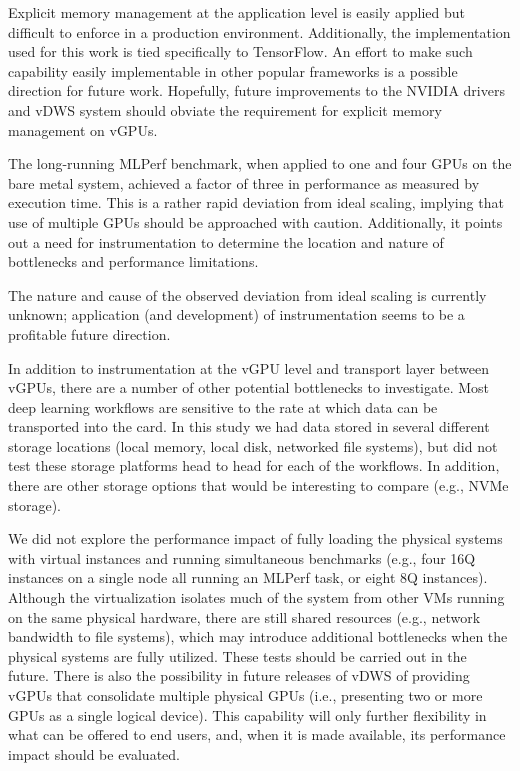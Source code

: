 \documentclass[acmtog, authorversion]{acmart}
\begin{document}
Explicit memory management at the application level is easily applied but difficult to enforce in a production environment. Additionally, the implementation used for this work is tied specifically to TensorFlow. An effort to make such capability easily implementable in other popular frameworks is a possible direction for future work. Hopefully, future improvements to the NVIDIA drivers and vDWS system should obviate the requirement for explicit memory management on vGPUs.

The long-running MLPerf benchmark, when applied to one and four GPUs on the bare metal system, achieved a factor of three in performance as measured by execution time.
This is a rather rapid deviation from ideal scaling, implying that use of multiple GPUs should be approached with caution. Additionally, it points out a need for instrumentation to determine the location and nature of bottlenecks and performance limitations.

The nature and cause of the observed deviation from ideal scaling is currently unknown; application (and development) of instrumentation seems to be a profitable future direction.

In addition to instrumentation at the vGPU level and transport layer between vGPUs, there are a number of other potential bottlenecks to investigate. Most deep learning workflows are sensitive to the rate at which data can be transported into the card. In this study we had data stored in several different storage locations (local memory, local disk, networked file systems), but did not test these storage platforms head to head for each of the workflows. In addition, there are other storage options that would be interesting to compare (e.g., NVMe storage).

We did not explore the performance impact of fully loading the physical systems with virtual instances and running simultaneous benchmarks (e.g., four 16Q instances on a single node all running an MLPerf task, or eight 8Q instances). Although the virtualization isolates much of the system from other VMs running on the same physical hardware, there are still shared resources (e.g., network bandwidth to file systems), which may introduce additional bottlenecks when the physical systems are fully utilized. These tests should be carried out in the future. There is also the possibility in future releases of vDWS of providing vGPUs that consolidate multiple physical GPUs (i.e., presenting two or more GPUs as a single logical device). This capability will only further flexibility in what can be offered to end users, and, when it is made available, its performance impact should be evaluated.
\end{document}
